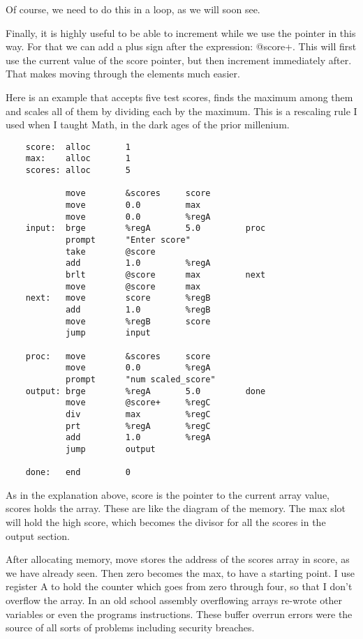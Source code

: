 Of course, we need to do this in a loop, as we will soon see.

Finally, it is highly useful to be able to increment while we use
the pointer in this way. For that we can add a plus sign after the
expression: @score+. This will first use the current value of the
score pointer, but then increment immediately after. That makes
moving through the elements much easier.

Here is an example that accepts five test scores, finds the maximum
among them and scales all of them by dividing each by the maximum.
This is a rescaling rule I used when I taught Math, in the dark ages
of the prior millenium.

{\footnotesize
\begin{verbatim}
    score:  alloc       1
    max:    alloc       1
    scores: alloc       5
    
            move        &scores     score
            move        0.0         max
            move        0.0         %regA
    input:  brge        %regA       5.0         proc
            prompt      "Enter score"
            take        @score
            add         1.0         %regA
            brlt        @score      max         next
            move        @score      max
    next:   move        score       %regB
            add         1.0         %regB
            move        %regB       score
            jump        input
    
    proc:   move        &scores     score
            move        0.0         %regA
            prompt      "num scaled_score"
    output: brge        %regA       5.0         done
            move        @score+     %regC
            div         max         %regC
            prt         %regA       %regC
            add         1.0         %regA
            jump        output
    
    done:   end         0
\end{verbatim}
}

As in the explanation above, score is the pointer to the current
array value, scores holds the array. These are like the diagram
of the memory. The max slot will hold the high score, which
becomes the divisor for all the scores in the output section.

After allocating memory, move stores the address of the scores array
in score, as we have already seen. Then zero becomes the max, to
have a starting point. I use register A to hold the counter which
goes from zero through four, so that I don't overflow the array.
In an old school assembly overflowing arrays re-wrote other variables
or even the programs instructions. These buffer overrun errors
were the source of all sorts of problems including security breaches.

